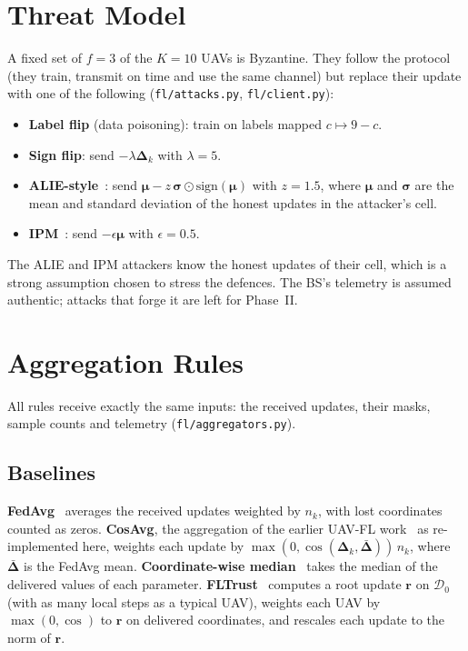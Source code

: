 \section{Threat Model}
A fixed set of $f=3$ of the $K=10$ UAVs is Byzantine. They follow the protocol (they
train, transmit on time and use the same channel) but replace their update with one
of the following (\texttt{fl/attacks.py}, \texttt{fl/client.py}):
\begin{itemize}
\item \textbf{Label flip} (data poisoning): train on labels mapped $c\mapsto 9-c$.
\item \textbf{Sign flip}: send $-\lambda\boldsymbol\Delta_k$ with $\lambda=5$.
\item \textbf{ALIE-style}~\cite{baruch2019alie}: send
  $\boldsymbol\mu-z\,\boldsymbol\sigma\odot\mathrm{sign}(\boldsymbol\mu)$ with $z=1.5$,
  where $\boldsymbol\mu$ and $\boldsymbol\sigma$ are the mean and standard deviation of
  the honest updates in the attacker's cell.
\item \textbf{IPM}~\cite{xie2019ipm}: send $-\epsilon\boldsymbol\mu$ with $\epsilon=0.5$.
\end{itemize}
The ALIE and IPM attackers know the honest updates of their cell, which is a strong
assumption chosen to stress the defences. The BS's telemetry is assumed authentic;
attacks that forge it are left for Phase~II.

\section{Aggregation Rules}
All rules receive exactly the same inputs: the received updates, their masks, sample
counts and telemetry (\texttt{fl/aggregators.py}).

\subsection{Baselines}
\textbf{FedAvg}~\cite{mcmahan2017fedavg} averages the received updates weighted by
$n_k$, with lost coordinates counted as zeros. \textbf{CosAvg}, the aggregation of the
earlier UAV-FL work~\cite{liao2023tee} as re-implemented here, weights each update by
$\max(0,\cos(\boldsymbol\Delta_k,\bar{\boldsymbol\Delta}))\,n_k$, where
$\bar{\boldsymbol\Delta}$ is the FedAvg mean. \textbf{Coordinate-wise
median}~\cite{yin2018median} takes the median of the delivered values of each
parameter. \textbf{FLTrust}~\cite{cao2021fltrust} computes a root update $\mathbf{r}$
on $\mathcal{D}_0$ (with as many local steps as a typical UAV), weights each UAV by
$\max(0,\cos)$ to $\mathbf{r}$ on delivered coordinates, and rescales each update to
the norm of $\mathbf{r}$.

